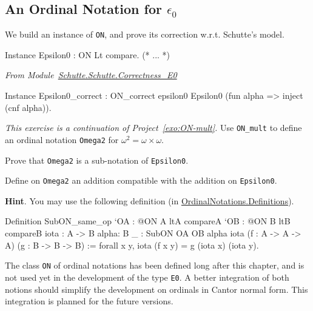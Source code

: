 \subsection{An Ordinal Notation for  \texorpdfstring{$\epsilon_0$}{epsilon0}}

We build an instance of \texttt{ON}, and prove its correction w.r.t. Schutte's model.

\label{instance-epsilon0}
\begin{Coqsrc}
Instance Epsilon0 : ON Lt compare.  
(* ... *)
\end{Coqsrc}


\emph{From Module~\href{../theories/html/hydras.Schutte.Schutte.Correctness_E0.html}{Schutte.Schutte.Correctness\_E0}}

\begin{Coqsrc}
Instance Epsilon0_correct :
  ON_correct epsilon0 Epsilon0 (fun alpha => inject (cnf alpha)).
\end{Coqsrc}

\begin{project}
 \emph{This exercise is a continuation of Project~\vref{exo:ON-mult}.}
Use \texttt{ON\_mult} to define an ordinal notation \texttt{Omega2} for $\omega^2=\omega\times\omega$.

Prove that \texttt{Omega2} is a sub-notation of \texttt{Epsilon0}.

Define on \texttt{Omega2} an addition compatible with the addition on \texttt{Epsilon0}.

\textbf{Hint}. You may use the following definition (in 
\href{../theories/html/hydras.OrdinalNotations.Definitions.html}{OrdinalNotations.Definitions}).

\begin{Coqsrc}
Definition SubON_same_op  `{OA : @ON A ltA  compareA}
       `{OB : @ON B ltB  compareB}
       {iota : A -> B} 
       {alpha: B}
       {_ : SubON OA OB alpha iota}
       (f : A -> A -> A)
       (g : B -> B -> B)
  :=
  forall x y,  iota (f x y) = g (iota x) (iota y).
\end{Coqsrc}

\end{project}

\begin{project}
The class \texttt{ON} of ordinal notations has been defined long after this 
chapter, and is not used yet in the development of the type \texttt{E0}. 
A better integration of both notions should simplify the development on ordinals in Cantor normal form. This integration is planned for the future versions.

\end{project}


